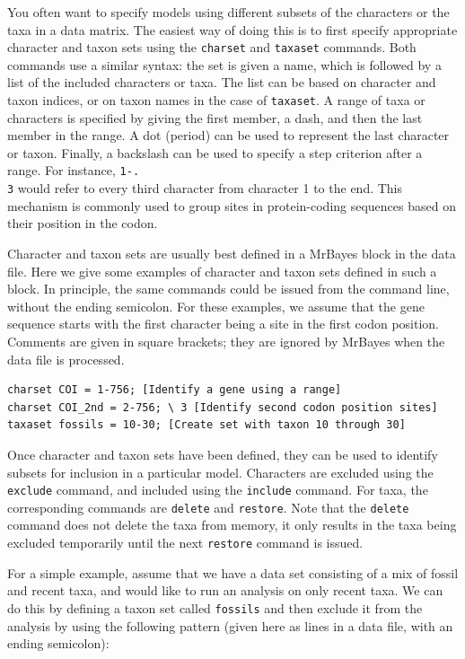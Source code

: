 \documentclass[12pt]{book}
\newcommand{\ttt}[1]{\texttt{#1}}
\begin{document}
You often want to specify models using different subsets of the characters or the taxa in a data
matrix. The easiest way of doing this is to first specify appropriate character and taxon sets
using the \ttt{charset} and \ttt{taxaset} commands. Both commands use a similar syntax: the set is
given a name, which is followed by a list of the included characters or taxa. The list can be based
on character and taxon indices, or on taxon names in the case of \ttt{taxaset}. A range of taxa or
characters is specified by giving the first member, a dash, and then the last member in the range.
A dot (period) can be used to represent the last character or taxon. Finally, a backslash can be
used to specify a step criterion after a range. For instance, \ttt{1-.\\3} would refer to every
third character from character 1 to the end. This mechanism is commonly used to group sites in
protein-coding sequences based on their position in the codon.

Character and taxon sets are usually best defined in a MrBayes block in the data file. Here we give
some examples of character and taxon sets defined in such a block. In principle, the same commands
could be issued from the command line, without the ending semicolon. For these examples, we assume
that the gene sequence starts with the first character being a site in the first codon position.
Comments are given in square brackets; they are ignored by MrBayes when the data file is processed.

\footnotesize
\begin{singlespacing}
\begin{verbatim}
charset COI = 1-756; [Identify a gene using a range]
charset COI_2nd = 2-756; \ 3 [Identify second codon position sites]
taxaset fossils = 10-30; [Create set with taxon 10 through 30]
\end{verbatim}
\end{singlespacing}
\normalsize

Once character and taxon sets have been defined, they can be used to identify subsets for inclusion
in a particular model. Characters are excluded using the \ttt{exclude} command, and included using
the \ttt{include} command. For taxa, the corresponding commands are \ttt{delete} and \ttt{restore}.
Note that the \ttt{delete} command does not delete the taxa from memory, it only results in the
taxa being excluded temporarily until the next \ttt{restore} command is issued.

For a simple example, assume that we have a data set consisting of a mix of fossil and recent taxa,
and would like to run an analysis on only recent taxa. We can do this by defining a taxon set
called \ttt{fossils} and then exclude it from the analysis by using the following pattern (given
here as lines in a data file, with an ending semicolon):
\end{document}
